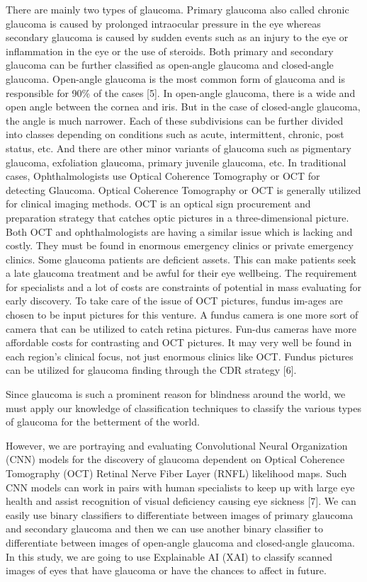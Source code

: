 \documentclass[conference]{IEEEtran}
\begin{document}
\noindent There are mainly two types of glaucoma. Primary glaucoma also called chronic glaucoma is caused by prolonged intraocular pressure in the eye whereas secondary glaucoma is caused by sudden events such as an injury to the eye or inflammation in the eye or the use of steroids. Both primary and secondary glaucoma can be further classified as open-angle glaucoma and closed-angle glaucoma. Open-angle glaucoma is the most common form of glaucoma and is responsible for 90\% of the cases [5].  In open-angle glaucoma, there is a wide and open angle between the cornea and iris. But in the case of closed-angle glaucoma, the angle is much narrower. Each of these subdivisions can be further divided into classes depending on conditions such as acute, intermittent, chronic, post status, etc. And there are other minor variants of glaucoma such as pigmentary glaucoma, exfoliation glaucoma, primary juvenile glaucoma, etc. In traditional cases, Ophthalmologists use Optical Coherence Tomography or OCT for detecting Glaucoma. Optical Coherence Tomography or OCT is generally utilized for clinical imaging methods. OCT is an optical sign procurement and preparation strategy that catches optic pictures in a three-dimensional picture. Both OCT and ophthalmologists are having a similar issue which is lacking and costly. They must be found in enormous emergency clinics or private emergency clinics. Some glaucoma patients are deficient assets. This can make patients seek a late glaucoma treatment and be awful for their eye wellbeing. The requirement for specialists and a lot of costs are constraints of potential in mass evaluating for early discovery. To take care of the issue of OCT pictures, fundus im-ages are chosen to be input pictures for this venture. A fundus camera is one more sort of camera that can be utilized to catch retina pictures. Fun-dus cameras have more affordable costs for contrasting and OCT pictures. It may very well be found in each region's clinical focus, not just enormous clinics like OCT. Fundus pictures can be utilized for glaucoma finding through the CDR strategy [6].

\noindent Since glaucoma is such a prominent reason for blindness around the world, we must apply our knowledge of classification techniques to classify the various types of glaucoma for the betterment of the world. 

\noindent However, we are portraying and evaluating Convolutional Neural Organization (CNN) models for the discovery of glaucoma dependent on Optical Coherence Tomography (OCT) Retinal Nerve Fiber Layer (RNFL) likelihood maps. Such CNN models can work in pairs with human specialists to keep up with large eye health and assist recognition of visual deficiency causing eye sickness [7]. We can easily use binary classifiers to differentiate between images of primary glaucoma and secondary glaucoma and then we can use another binary classifier to differentiate between images of open-angle glaucoma and closed-angle glaucoma. In this study, we are going to use Explainable AI (XAI) to classify scanned images of eyes that have glaucoma or have the chances to affect in future.
\end{document}
